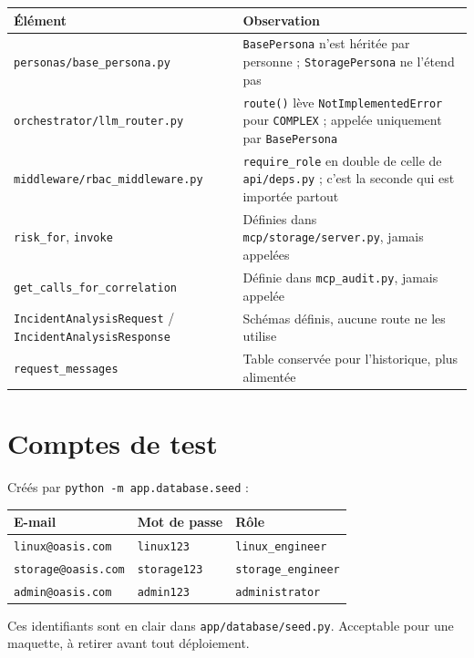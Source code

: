 \documentclass[11pt,a4paper]{report}
\newcommand{\file}[1]{\texttt{\small #1}}
\newcommand{\fn}[1]{\texttt{\small\textcolor{oasisviolet}{#1}}}
\newcommand{\cls}[1]{\texttt{\small\textcolor{oasisblue}{#1}}}
\newcommand{\tbl}[1]{\texttt{\small\textcolor{oasisamber}{#1}}}
\begin{document}
\begin{longtable}{@{}p{5.4cm}p{9.4cm}@{}}
\toprule
\textbf{Élément} & \textbf{Observation}\\
\midrule
\endhead
\file{personas/base\_persona.py} & \cls{BasePersona} n'est héritée par personne ; \cls{StoragePersona} ne l'étend pas\\
\file{orchestrator/llm\_router.py} & \fn{route()} lève \texttt{NotImplementedError} pour \texttt{COMPLEX} ; appelée uniquement par \cls{BasePersona}\\
\file{middleware/rbac\_middleware.py} & \fn{require\_role} en double de celle de \file{api/deps.py} ; c'est la seconde qui est importée partout\\
\fn{risk\_for}, \fn{invoke} & Définies dans \file{mcp/storage/server.py}, jamais appelées\\
\fn{get\_calls\_for\_correlation} & Définie dans \file{mcp\_audit.py}, jamais appelée\\
\cls{IncidentAnalysisRequest} / \cls{IncidentAnalysisResponse} & Schémas définis, aucune route ne les utilise\\
\tbl{request\_messages} & Table conservée pour l'historique, plus alimentée\\
\bottomrule
\end{longtable}

\section{Comptes de test}

Créés par \texttt{python -m app.database.seed} :

\begin{longtable}{@{}p{5.0cm}p{4.0cm}p{5.2cm}@{}}
\toprule
\textbf{E-mail} & \textbf{Mot de passe} & \textbf{Rôle}\\
\midrule
\endhead
\texttt{linux@oasis.com} & \texttt{linux123} & \texttt{linux\_engineer}\\
\texttt{storage@oasis.com} & \texttt{storage123} & \texttt{storage\_engineer}\\
\texttt{admin@oasis.com} & \texttt{admin123} & \texttt{administrator}\\
\bottomrule
\end{longtable}

\begin{warnbox}
Ces identifiants sont en clair dans \file{app/database/seed.py}. Acceptable pour
une maquette, à retirer avant tout déploiement.
\end{warnbox}
\end{document}
